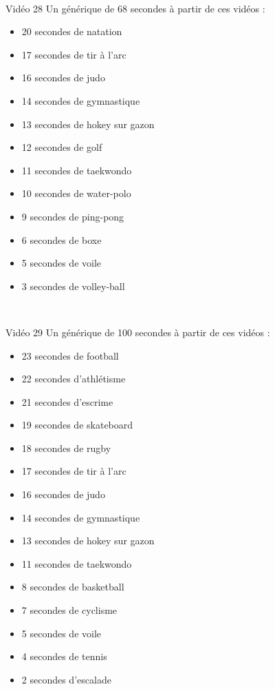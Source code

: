 \documentclass[10pt, a5paper,twoside]{article}
\begin{document}
\vfill

\clearpage
~
\vfill

\begin{card}[width = \textwidth, colback = olympicyellow, colframe = olympicyellow, bottomtitle = 2mm]{Vidéo 28}
  Un générique de 68 secondes à partir de ces vidéos :
  \vspace{-1mm}\begin{itemize}
    \item 20 secondes de natation
    \item 17 secondes de tir à l'arc
    \item 16 secondes de judo
    \item 14 secondes de gymnastique
    \item 13 secondes de hokey sur gazon
    \item 12 secondes de golf
    \item 11 secondes de taekwondo
    \item 10 secondes de water-polo
    \item 9 secondes de ping-pong
    \item 6 secondes de boxe
    \item 5 secondes de voile
    \item 3 secondes de volley-ball
  \end{itemize}
\end{card}

\vfill

\clearpage
~
\vfill

\begin{card}[width = \textwidth, colback = olympicyellow, colframe = olympicyellow, bottomtitle = 2mm]{Vidéo 29}
  Un générique de 100 secondes à partir de ces vidéos :
  \vspace{-1mm}\begin{itemize}
    \item 23 secondes de football
    \item 22 secondes d'athlétisme
    \item 21 secondes d'escrime
    \item 19 secondes de skateboard
    \item 18 secondes de rugby
    \item 17 secondes de tir à l'arc
    \item 16 secondes de judo
    \item 14 secondes de gymnastique
    \item 13 secondes de hokey sur gazon
    \item 11 secondes de taekwondo
    \item 8 secondes de basketball
    \item 7 secondes de cyclisme
    \item 5 secondes de voile
    \item 4 secondes de tennis
    \item 2 secondes d'escalade
  \end{itemize}
\end{card}
\end{document}
